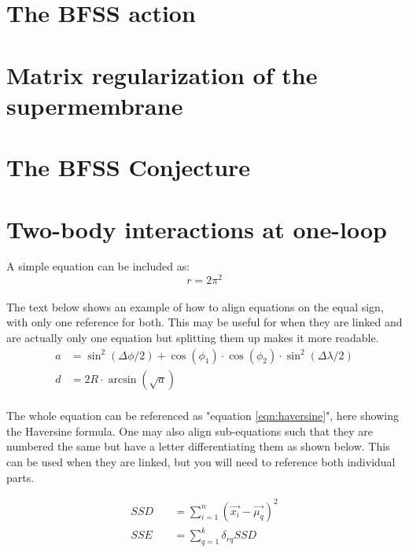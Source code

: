 
\section{The BFSS action}
\section{Matrix regularization of the supermembrane}
\section{The BFSS Conjecture}
\section{Two-body interactions at one-loop}

A simple equation can be included as: \\

\begin{equation}
        r = 2\pi^{2}
        \label{eqn:simple_eqn}
\end{equation} \\


\noindent The text below shows an example of how to align equations on the equal sign, with only one reference for both. This may be useful for when they are linked and are actually only one equation but splitting them up makes it more readable. \\

\begin{equation}
\begin{aligned}
        a &= \sin^{2}(\Delta\phi/2) + \cos(\phi_{1})\cdot\cos(\phi_{2})\cdot\sin^{2}(\Delta\lambda/2)\\
        d &= 2R\cdot\arcsin(\sqrt{a})
\end{aligned}
\label{eqn:haversine}
\end{equation} \\

\noindent The whole equation can be referenced as "equation \eqref{eqn:haversine}", here showing the Haversine formula. One may also align sub-equations such that they are numbered the same but have a letter differentiating them as shown below. This can be used when they are linked, but you will need to reference both individual parts.

\begin{subequations}
\begin{align}
    SSD 
        & \quad = \sum_{i=1}^{n} (\vec{x_{i}}-\vec{\mu_{q}})^{2} \label{eq:ssd}\\[15pt] %
    SSE 
        & \quad = \sum_{q=1}^{k} \delta_{rq} SSD \label{eq:sse}
\end{align}
\label{eqn:subeqn}
\end{subequations} \\


